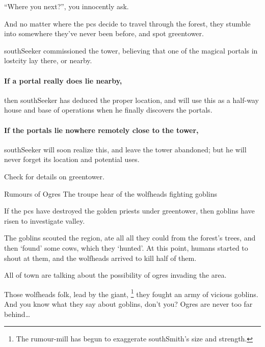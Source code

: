 ``Where you next?'', you innocently ask.

And no matter where the \glspl{pc} decide to travel through the forest, they stumble into somewhere they've never been before, and spot \gls{greentower}.

\Gls{southSeeker} commissioned the tower, believing that one of the magical portals in \gls{lostcity} lay there, or nearby.

\paragraph{If a portal really does lie nearby,}
then \gls{southSeeker} has deduced the proper location, and will use this as a half-way house and base of operations when he finally discovers the portals.

\paragraph{If the portals lie nowhere remotely close to the tower,}
\gls{southSeeker} will soon realize this, and leave the tower abandoned; but he will never forget its location and potential uses.

Check  for details on \gls{greentower}.

{\squash Rumours of Ogres}%
{The troupe hear of the \glspl{wolfhead} fighting goblins}%

If the \glspl{pc} have destroyed the golden priests under \gls{greentower}, then goblins have risen to investigate \gls{valley}.

\begin{exampletext}
  The goblins scouted the region, ate all all they could from the forest's trees, and then `found' some cows, which they `hunted'.
  At this point, humans started to shout at them, and the \glspl{wolfhead} arrived to kill half of them.
\end{exampletext}

All of \gls{town} are talking about the possibility of ogres invading the area.

\begin{speechtext}
  Those \glspl{wolfhead} folk, lead by the giant,%
  \footnote{The rumour-mill has begun to exaggerate \gls{southSmith}'s size and strength.}
  they fought an army of vicious goblins.
  And you know what they say about goblins, don't you?
  Ogres are never too far behind\ldots
\end{speechtext}


